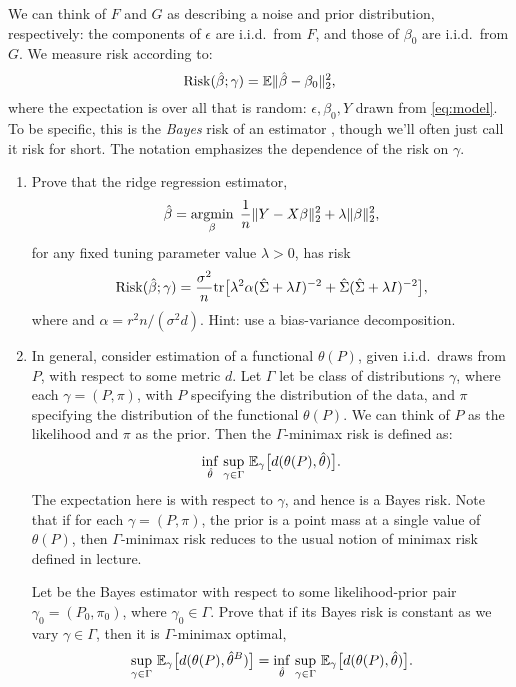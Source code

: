 \documentclass{article}
\begin{document}
We can think of $F$ and $G$ as describing a noise and prior distribution,
respectively: the components of $\epsilon$ are i.i.d.\ from $F$, and those of  
$\beta_0$ are i.i.d.\ from $G$. We measure risk according to:
\[
\mathrm{Risk}(\hat{\beta}; \gamma) = \mathbb{E} \|\hat{\beta} - \beta_0\|_2^2,
\]
where the expectation is over all that is random: $\epsilon, \beta_0, Y$ drawn 
from \eqref{eq:model}. To be specific, this is the \emph{Bayes} risk of an
estimator \smash{$\hbeta$}, though we'll often just call it risk for short. The
notation \smash{$\Risk(\hbeta; \gamma)$} emphasizes the dependence of the risk
on $\gamma$.    

\begin{enumerate}[label=(\alph*)]
\item Prove that the ridge regression estimator,
  \[
  \hat{\beta} = \mathop{\mathrm{argmin}}_\beta \; \frac{1}{n} \|Y - X\beta\|_2^2 + \lambda
  \|\beta\|_2^2, 
  \]
  for any fixed tuning parameter value $\lambda > 0$, has risk 
  \marginpar{\small [4 pts]}
  \[
  \mathrm{Risk}(\hat{\beta}; \gamma) = \frac{\sigma^2}{n} \mathrm{tr} \big[ \lambda^2 \alpha (\hat\Sigma
  + \lambda I)^{-2} + \hat\Sigma ( \hat\Sigma + \lambda I)^{-2} \big],
  \]
  where  and $\alpha = r^2n / (\sigma^2 d)$. Hint:
  use a bias-variance decomposition.

\item In general, consider estimation of a functional $\theta(P)$, given i.i.d.\ 
  draws from $P$, with respect to some metric $d$. Let $\Gamma$ let be class of 
  distributions $\gamma$, where each $\gamma = (P,\pi)$, with $P$ specifying the 
  distribution of the data, and $\pi$ specifying the distribution of the
  functional $\theta(P)$. We can think of $P$ as the likelihood and $\pi$ as the 
  prior. Then the $\Gamma$-minimax risk is defined as:    
  \[
  \inf_{\hat{\theta}} \, \sup_{\gamma \in \Gamma} \, \mathbb{E}_\gamma \big[ d(\theta(P),
  \hat{\theta}) \big]. 
  \]
  The expectation here is with respect to $\gamma$, and hence is a Bayes
  risk. Note that if for each $\gamma = (P,\pi)$, the prior is a point mass at a
  single value of $\theta(P)$, then $\Gamma$-minimax risk reduces to the usual
  notion of minimax risk defined in lecture.      

  Let  be the Bayes estimator with respect to some
  likelihood-prior pair $\gamma_0 = (P_0,\pi_0)$, where $\gamma_0 \in
  \Gamma$. Prove that if its Bayes risk is constant as we vary $\gamma \in
  \Gamma$, then it is $\Gamma$-minimax optimal,  
  \marginpar{\small [3 pts]}
  \[
  \sup_{\gamma \in \Gamma} \, \mathbb{E}_\gamma \big[ d(\theta(P), \hat{\theta}^B) \big]
  = \inf_{\hat{\theta}} \, \sup_{\gamma \in \Gamma} \, \mathbb{E}_\gamma \big[ d(\theta(P), 
  \hat{\theta}) \big].
  \]


\end{enumerate}
\end{document}

